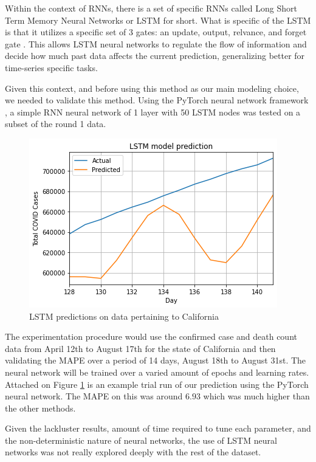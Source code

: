 \documentclass[sigconf,nonacm]{acmart}
\begin{document}
Within the context of RNNs, there is a set of specific RNNs called Long Short
Term Memory Neural Networks or LSTM for short. What is specific of the LSTM is
that it utilizes a specific set of 3 gates: an update, output, relvance, and
forget gate \cite{LSTMlecture}. This allows LSTM neural networks to regulate
the flow of information and decide how much past data affects the current
prediction, generalizing better for time-series specific tasks.

Given this context, and before using this method as our main modeling choice,
we needed to validate this method. Using the PyTorch neural network framework
\cite{Pytorch}, a simple RNN neural network of 1 layer with 50 LSTM nodes was
tested on a subset of the round 1 data. 

\begin{figure}
  \centering
  \includegraphics[width=\linewidth]{figures/LSTMPytorch.png}
  \caption{LSTM predictions on data pertaining to California}
  \label{fig:LSTM_trial}
\end{figure} 

The experimentation procedure would use the confirmed case and death count data
from April 12th to August 17th for the state of California and then validating
the MAPE over a period of 14 days, August 18th to August 31st. The neural
network will be trained over a varied amount of epochs and learning rates. 
Attached on Figure  \ref{fig:LSTM_trial} is an example trial run of our
prediction using the PyTorch neural network. The MAPE on this was around $6.93$
which was much higher than the other methods.

Given the lackluster results, amount of time required to tune each parameter,
and the non-deterministic nature of neural networks, the use of LSTM neural
networks was not really explored deeply with the rest of the dataset.
\end{document}

